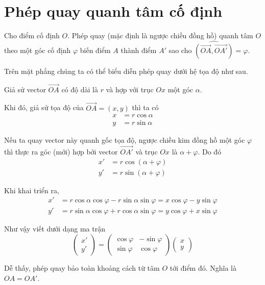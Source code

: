 \section{Phép quay quanh tâm cố định}

Cho điểm cố định $O$. Phép quay (mặc định là ngược chiều đồng hồ) quanh tâm $O$
theo một góc cố định $\varphi$ biến điểm $A$ thành điểm $A'$ sao cho
$\widehat{(\overrightarrow{OA}, \overrightarrow{OA'})} = \varphi$.

Trên mặt phẳng chúng ta có thể biểu diễn phép quay dưới hệ tọa độ như sau.

Giả sử vector $\overrightarrow{OA}$ có độ dài là $r$ và hợp với trục $Ox$ một góc $\alpha$.

Khi đó, giả sử tọa độ của $\overrightarrow{OA} = (x, y)$ thì ta có 
\begin{align*}
    x & = r \cos \alpha \\
    y & = r \sin \alpha
\end{align*}

Nếu ta quay vector này quanh gốc tọa độ, ngược chiều kim đồng hồ một góc $\varphi$ thì 
thực ra góc (mới) hợp bởi vector $\overrightarrow{OA'}$ và trục $Ox$ là $\alpha + \varphi$.
Do đó
\begin{align*}
    x' & = r \cos (\alpha + \varphi) \\
    y' & = r \sin (\alpha + \varphi)
\end{align*}

Khi khai triển ra,
\begin{align*}
    x' & = r \cos \alpha \cos \varphi - r \sin \alpha \sin \varphi
= x \cos \varphi - y \sin \varphi \\
    y' & = r \sin \alpha \cos \varphi + r \cos \alpha \sin \varphi 
= y \cos \varphi + x \sin \varphi
\end{align*}

Như vậy viết dưới dạng ma trận
\[\begin{pmatrix}
    x' \\ y'
\end{pmatrix} = \begin{pmatrix}
    \cos \varphi & -\sin \varphi \\
    \sin \varphi & \cos \varphi
\end{pmatrix} \begin{pmatrix}
    x \\ y
\end{pmatrix}\]

Dễ thấy, phép quay bảo toàn khoảng cách từ tâm $O$ tới điểm đó. Nghĩa là $OA = OA'$.